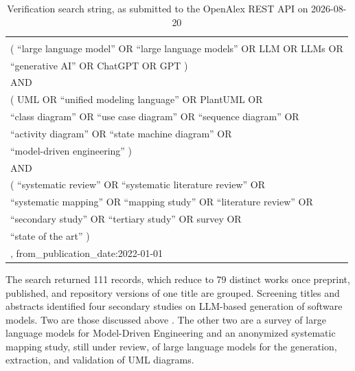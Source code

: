\begin{table}[htbp]
\centering
\caption{Verification search string, as submitted to the OpenAlex REST API on 2026-08-20}
\label{tab:protocol_verification_search}
\begin{tabular}{@{}l@{}}
\toprule
\begin{minipage}{0.95\textwidth}\vspace{3pt}
\scriptsize\ttfamily\raggedright
filter=title\_and\_abstract.search:\\
\quad ( ``large language model'' OR ``large language models'' OR LLM OR LLMs OR\\
\quad ``generative AI'' OR ChatGPT OR GPT )\\
\quad AND\\
\quad ( UML OR ``unified modeling language'' OR PlantUML OR\\
\quad ``class diagram'' OR ``use case diagram'' OR ``sequence diagram'' OR\\
\quad ``activity diagram'' OR ``state machine diagram'' OR\\
\quad ``model-driven engineering'' )\\
\quad AND\\
\quad ( ``systematic review'' OR ``systematic literature review'' OR\\
\quad ``systematic mapping'' OR ``mapping study'' OR ``literature review'' OR\\
\quad ``secondary study'' OR ``tertiary study'' OR survey OR\\
\quad ``state of the art'' )\\
, from\_publication\_date:2022-01-01
\vspace{3pt}
\end{minipage}\\
\bottomrule
\end{tabular}
\end{table}

The search returned 111 records, which reduce to 79 distinct works once preprint, published, and repository versions of one title are grouped. Screening titles and abstracts identified four secondary studies on LLM-based generation of software models. Two are those discussed above \cite{Zhang2027LLMMDE,Rahmanian2026Diagrams}. The other two are a survey of large language models for Model-Driven Engineering and an anonymized systematic mapping study, still under review, of large language models for the generation, extraction, and validation of UML diagrams.

